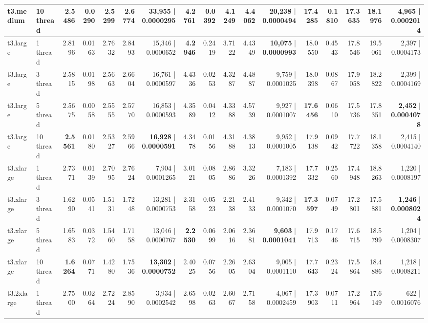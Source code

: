 \documentclass[conference]{IEEEtran}
\begin{document}
\begin{table}[h]
{\begin{tabular}{ll|rrrrr|rrrrr|rrrrr}
			t3.medium & 10 thread & 2.5486 & 0.0290 & 2.5299 & 2.6774 & 33,955 | 0.0000295 & \textbf{4.2761} & 0.0392 & 4.1249 & 4.4062 & \textbf{20,238} | \textbf{0.0000494} & \textbf{17.4285} & 0.1810 & 17.3635 & 18.1976 & \textbf{4,965} | \textbf{0.0002014} \\
			\midrule
			t3.large & 1 thread & 2.8196 & 0.0163 & 2.7632 & 2.8493 & 15,346 | 0.0000652 & \textbf{4.2946} & 0.2419 & 3.7122 & 4.4349 & \textbf{10,075} | \textbf{0.0000993} & 18.0550 & 0.4543 & 17.8546 & 19.5061 & 2,397 | 0.0004173 \\
			t3.large & 3 thread & 2.5815 & 0.0198 & 2.5663 & 2.6604 & 16,761 | 0.0000597 & 4.4336 & 0.0253 & 4.3287 & 4.4887 & 9,759 | 0.0001025 & 18.0398 & 0.0867 & 17.9058 & 18.2822 & 2,399 | 0.0004169 \\
			t3.large & 5 thread & 2.5675 & 0.0058 & 2.5555 & 2.5770 & 16,853 | 0.0000593 & 4.3589 & 0.0412 & 4.3388 & 4.5739 & 9,927 | 0.0001007 & \textbf{17.6456} & 0.0610 & 17.5736 & 17.8351 & \textbf{2,452} | \textbf{0.0004078} \\
			t3.large & 10 thread & \textbf{2.5561} & 0.0180 & 2.5327 & 2.5966 & \textbf{16,928} | \textbf{0.0000591} & 4.3478 & 0.0156 & 4.3188 & 4.3813 & 9,952 | 0.0001005 & 17.9138 & 0.0942 & 17.7722 & 18.1358 & 2,415 | 0.0004140 \\
			\midrule
			t3.xlarge & 1 thread & 2.7371 & 0.0139 & 2.7095 & 2.7624 & 7,904 | 0.0001265 & 3.0121 & 0.0805 & 2.8686 & 3.3226 & 7,183 | 0.0001392 & 17.7332 & 0.2560 & 17.4948 & 18.8263 & 1,220 | 0.0008197 \\
			t3.xlarge & 3 thread & 1.6290 & 0.0541 & 1.5131 & 1.7248 & 13,281 | 0.0000753 & 2.3158 & 0.0523 & 2.2138 & 2.4133 & 9,342 | 0.0001070 & \textbf{17.3597} & 0.0749 & 17.2801 & 17.5881 & \textbf{1,246} | \textbf{0.0008024} \\
			t3.xlarge & 5 thread & 1.6583 & 0.0372 & 1.5460 & 1.7158 & 13,046 | 0.0000767 & \textbf{2.2530} & 0.0699 & 2.0616 & 2.3681 & \textbf{9,603} | \textbf{0.0001041} & 17.9713 & 0.1746 & 17.6715 & 18.5799 & 1,204 | 0.0008307 \\
			t3.xlarge & 10 thread & \textbf{1.6264} & 0.0771 & 1.4280 & 1.7536 & \textbf{13,302} | \textbf{0.0000752} & 2.4025 & 0.0756 & 2.2605 & 2.6304 & 9,005 | 0.0001110 & 17.7643 & 0.2324 & 17.5864 & 18.4886 & 1,218 | 0.0008211 \\
			\midrule
			t3.2xlarge & 1 thread & 2.7500 & 0.0264 & 2.7224 & 2.8590 & 3,934 | 0.0002542 & 2.6598 & 0.0263 & 2.6067 & 2.7158 & 4,067 | 0.0002459 & 17.3903 & 0.0711 & 17.2964 & 17.6149 & 622 | 0.0016076 \\

\end{tabular}}
\end{table}
\end{document}
